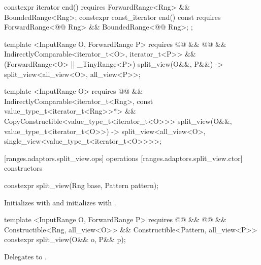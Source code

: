 \begin{codeblock}
{{{{{    constexpr iterator end()
      requires ForwardRange<Rng> && BoundedRange<Rng>;
    constexpr const_iterator end() const
      requires ForwardRange<@@ Rng> && BoundedRange<@@ Rng>;
  };

  template <InputRange O, ForwardRange P>
    requires @@ &&
      @@ &&
      IndirectlyComparable<iterator_t<O>, iterator_t<P>> &&
      (ForwardRange<O> || _TinyRange<P>)
  split_view(O&&, P&&) -> split_view<all_view<O>, all_view<P>>;

  template <InputRange O>
    requires @@ &&
      IndirectlyComparable<iterator_t<Rng>, const value_type_t<iterator_t<Rng>>*> &&
      CopyConstructible<value_type_t<iterator_t<O>>>
  split_view(O&&, value_type_t<iterator_t<O>>)
    -> split_view<all_view<O>, single_view<value_type_t<iterator_t<O>>>>;
}}}}
\end{codeblock}

[ranges.adaptors.split_view.ops]{ operations}
[ranges.adaptors.split_view.ctor]{ constructors}

%
\begin{itemdecl}
constexpr split_view(Rng base, Pattern pattern);
\end{itemdecl}

\begin{itemdescr}
\pnum
\effects Initializes  with  and initializes
 with .
\end{itemdescr}

%
\begin{itemdecl}
template <InputRange O, ForwardRange P>
requires @@ &&
    @@ &&
    Constructible<Rng, all_view<O>> &&
    Constructible<Pattern, all_view<P>>
constexpr split_view(O&& o, P&& p);
\end{itemdecl}

\begin{itemdescr}
\pnum
\effects Delegates to
.
\end{itemdescr}

